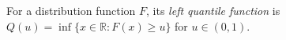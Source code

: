 
For a distribution function $F$, its \emph{left quantile function} is $Q(u)=\inf\{x\in\mathbb R:F(x)\ge u\}$ for $u\in(0,1)$.
